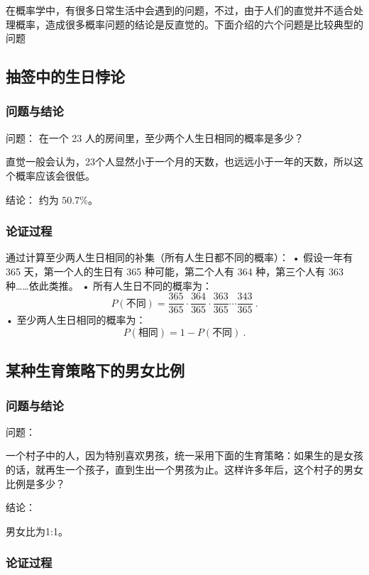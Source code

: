 
在概率学中，有很多日常生活中会遇到的问题，不过，由于人们的直觉并不适合处理概率，造成很多概率问题的结论是反直觉的。下面介绍的六个问题是比较典型的问题

\subsection{抽签中的生日悖论}

\subsubsection{问题与结论}

问题：
在一个 23 人的房间里，至少两个人生日相同的概率是多少？

直觉一般会认为，23个人显然小于一个月的天数，也远远小于一年的天数，所以这个概率应该会很低。

结论：
约为 $50.7\%$。

\subsubsection{论证过程}

通过计算至少两人生日相同的补集（所有人生日都不同的概率）：
	•	假设一年有 365 天，第一个人的生日有 365 种可能，第二个人有 364 种，第三个人有 363 种……依此类推。
	•	所有人生日不同的概率为：
$$
P(\text{不同}) = \frac{365}{365} \cdot \frac{364}{365} \cdot \frac{363}{365} \cdots \frac{343}{365}~.
$$
	•	至少两人生日相同的概率为：
$$
P(\text{相同}) = 1 - P(\text{不同})~.
$$


\subsection{某种生育策略下的男女比例}

\subsubsection{问题与结论}

问题：

一个村子中的人，因为特别喜欢男孩，统一采用下面的生育策略：如果生的是女孩的话，就再生一个孩子，直到生出一个男孩为止。这样许多年后，这个村子的男女比例是多少？

结论：

男女比为1:1。

\subsubsection{论证过程}

